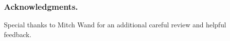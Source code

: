 \documentclass{llncs}
\begin{document}

\subsubsection*{Acknowledgments.} Special thanks to Mitch Wand for an additional careful review and helpful feedback.

\end{document}
